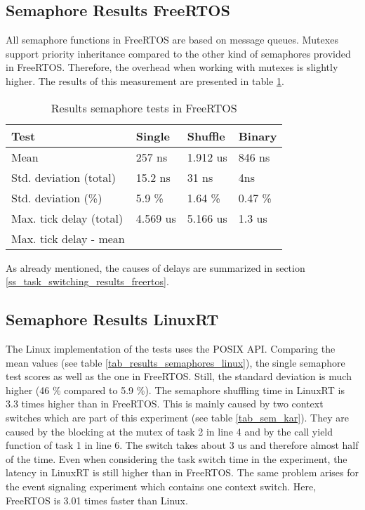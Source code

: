 \subsection{Semaphore Results FreeRTOS}
All semaphore functions in FreeRTOS are based on message queues.
Mutexes support priority inheritance compared to the other kind of semaphores provided in FreeRTOS.
Therefore, the overhead when working with mutexes is slightly higher. 
The results of this measurement are presented in table \ref{tab_results_semaphores_freertos}. 

\begin{table}[htbp]
	\centering
		\begin{tabular}{|l||l|l|l|}
			\hline
				Test 											& Single 		& Shuffle 	& Binary 	\\
				\hline 
				Mean  										& 257 ns		& 1.912 us	& 846 ns	\\
			  \hline
			  Std. deviation (total)	  & 15.2 ns		& 31 ns			&	4ns			\\
			  \hline
			  Std. deviation (\%)  			& 5.9 \%		& 1.64 \%		&	0.47 \% \\ 
			  \hline
			  Max. tick delay	(total)		& 4.569 us	& 5.166 us	&	1.3 us  \\
				\hline
				Max. tick delay - mean		&						&						&					\\
			\hline
		\end{tabular}
	\caption{Results semaphore tests in FreeRTOS}
	\label{tab_results_semaphores_freertos}
\end{table}

As already mentioned, the causes of delays are summarized in section \ref{ss_task_switching_results_freertos}.

\subsection{Semaphore Results LinuxRT}
The Linux implementation of the tests uses the POSIX \ac{API}.
Comparing the mean values (see table \ref{tab_results_semaphores_linux}), the single semaphore test scores as well as the one in FreeRTOS.
Still, the standard deviation is much higher (46 \% compared to 5.9 \%).
The semaphore shuffling time in LinuxRT is 3.3 times higher than in FreeRTOS.
This is mainly caused by two context switches which are part of this experiment (see table \ref{tab_sem_kar}). 
They are caused by the blocking at the mutex of task 2 in line 4 and by the call yield function of task 1 in line 6.
The switch takes about 3 us and therefore almost half of the time. 
Even when considering the task switch time in the experiment, the latency in LinuxRT is still higher than in FreeRTOS.
The same problem arises for the event signaling experiment which contains one context switch.
Here, FreeRTOS is 3.01 times faster than Linux. 


